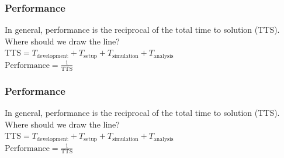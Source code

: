\begin{frame}\frametitle{Performance}
\begin{center}
In general, performance is the reciprocal of the total time to solution (TTS). Where should we draw the line?\\
\vspace{40pt}
$\text{TTS} = T_\text{development} + T_\text{setup} + T_\text{simulation} + T_\text{analysis}$\\ 
\vspace{20pt}
$\text{Performance} = \frac{1}{\text{TTS}}$
\end{center}
\end{frame}

\begin{frame}\frametitle{Performance}
\begin{center}
In general, performance is the reciprocal of the total time to solution (TTS). Where should we draw the line?\\
\vspace{40pt}
$\text{TTS} = T_\text{development} + T_\text{setup} + T_\text{simulation} + T_\text{analysis}$\\ 
\vspace{20pt}
$\text{Performance} = \frac{1}{\text{TTS}}$
\end{center}
\end{frame}

